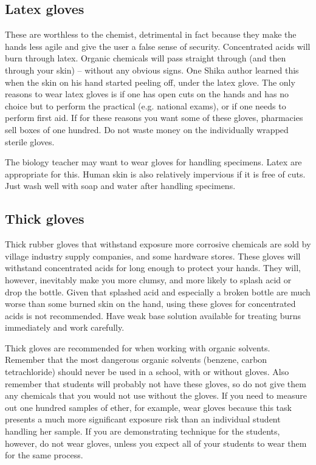 \subsection{Latex gloves}
These are worthless to the chemist, 
detrimental in fact because they make the hands less agile 
and give the user a false sense of security. 
Concentrated acids will burn through latex. 
Organic chemicals will pass straight through (and then through your skin) – 
without any obvious signs. 
One Shika author learned this when the skin on his hand started peeling off, 
under the latex glove. 
The only reasons to wear latex gloves is if one has open cuts on the hands 
and has no choice but to perform the practical (e.g. 
national exams), 
or if one needs to perform first aid. 
If for these reasons you want some of these gloves, 
pharmacies sell boxes of one hundred. 
Do not waste money on the individually wrapped sterile gloves.

The biology teacher may want to wear gloves for handling specimens. 
Latex are appropriate for this. 
Human skin is also relatively impervious if it is free of cuts. 
Just wash well with soap and water after handling specimens.

\subsection{Thick gloves}
Thick rubber gloves that withstand exposure more corrosive chemicals 
are sold by village industry supply companies, 
and some hardware stores. 
These gloves will withstand concentrated acids 
for long enough to protect your hands. 
They will, 
however, 
inevitably make you more clumsy, 
and more likely to splash acid or drop the bottle. 
Given that splashed acid and especially a broken bottle 
are much worse than some burned skin on the hand, 
using these gloves for concentrated acids is not recommended. 
Have weak base solution available for treating burns immediately 
and work carefully.

Thick gloves are recommended for when working with organic solvents. 
Remember that the most dangerous organic solvents (benzene, 
carbon tetrachloride) should never be used in a school, 
with or without gloves. 
Also remember that students will probably not have these gloves, 
so do not give them any chemicals 
that you would not use without the gloves. 
If you need to measure out one hundred samples of ether, 
for example, 
wear gloves because this task presents 
a much more significant exposure risk 
than an individual student handling her sample. 
If you are demonstrating technique for the students, 
however, 
do not wear gloves, 
unless you expect all of your students to wear them for the same process.

